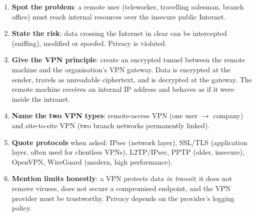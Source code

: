 \documentclass[11pt]{article}
\newcommand{\cle}[1]{{\popxbold\color{popdark}#1}}
\begin{document}
\begin{methode}
\begin{enumerate}
\item \textbf{Spot the problem}: a remote user (teleworker, travelling salesman, branch office) must reach internal resources over the insecure public Internet.
\item \textbf{State the risk}: data crossing the Internet in clear can be intercepted (sniffing), modified or spoofed. Privacy is violated.
\item \textbf{Give the VPN principle}: create an encrypted \cle{tunnel} between the remote machine and the organisation's VPN gateway. Data is encrypted at the sender, travels as unreadable ciphertext, and is decrypted at the gateway. The remote machine receives an internal IP address and behaves as if it were inside the intranet.
\item \textbf{Name the two VPN types}: \cle{remote-access VPN} (one user $\to$ company) and \cle{site-to-site VPN} (two branch networks permanently linked).
\item \textbf{Quote protocols} when asked: IPsec (network layer), SSL/TLS (application layer, often used for clientless VPNs), L2TP/IPsec, PPTP (older, insecure), OpenVPN, WireGuard (modern, high performance).
\item \textbf{Mention limits honestly}: a VPN protects data \emph{in transit}; it does not remove viruses, does not secure a compromised endpoint, and the VPN provider must be trustworthy. Privacy depends on the provider's logging policy.
\end{enumerate}
\end{methode}
\end{document}
